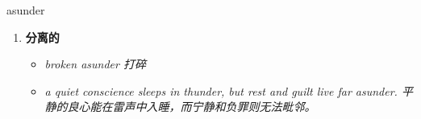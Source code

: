 
\begin{frame}
{\huge asunder}
\begin{center}
\begin{enumerate}\Large
  \item \textbf{分离的}
  \begin{itemize}
    \item \em{\Large{broken asunder 打碎}}
    \item \em{\Large{a quiet conscience sleeps in thunder, but rest and guilt live far asunder. 平静的良心能在雷声中入睡，而宁静和负罪则无法毗邻。}}
  \end{itemize}
\end{enumerate}
\end{center}
\end{frame}
